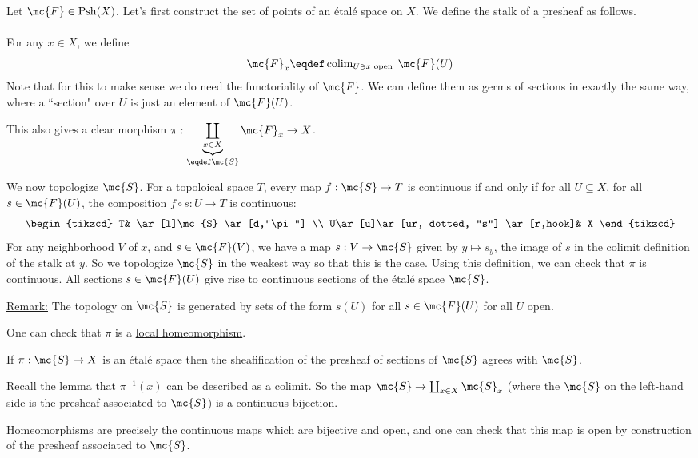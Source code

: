 \documentclass[x11names,reqno,14pt]{extarticle}
\DeclareMathOperator{\Psh}{Psh}
\begin{document}
Let $\mc{F} \in \Psh(X)$. Let's first construct the set of points of an \'etal\'e space on $X$. We define the stalk of a presheaf as follows. 

\paragraph{} For any $x \in X$, we define 
\[
\mc{F}_x\eqdef \operatorname{colim}_{U\ni x\text{ open }}\mc{F}(U)
\]
Note that for this to make sense we do need the functoriality of $\mc{F}$. We can define them as germs of sections in exactly the same way, where a ``section" over $U$ is just an element of $\mc{F}(U)$. 

This also gives a clear morphism $\pi:\underbrace{\coprod_{x\in X}}_{\eqdef \mc{S}}\mc{F}_x\to X$.

We now topologize $\mc{S}$. For a topoloical space $T$, every map $f:\mc{S}\to T$ is continuous if and only if for all $U \subseteq X$, for all $s \in \mc{F}(U)$, the composition $f\circ s:U\to T$ is continuous:
\[
\begin{tikzcd}
T& \ar[l]\mc{S} \ar[d,"\pi"] \\
U\ar[u]\ar[ur, dotted, "s"] \ar[r,hook]& X 
\end{tikzcd}
\]
For any neighborhood $V$ of $x$, and $s \in \mc{F}(V)$, we have a map $s:V\to \mc{S}$ given by $y\mapsto s_y$, the image of $s$ in the colimit definition of the stalk at $y$.
So we topologize $\mc{S}$ in the weakest way so that this is the case. Using this definition, we can check that $\pi$ is continuous. All sections $s \in \mc{F}(U)$ give rise to continuous sections of the \'etal\'e space $\mc{S}$. 

\underline{Remark:} The topology on $\mc{S}$ is generated by sets of the form $s(U)$ for all $s\in \mc{F}(U)$ for all $U$ open. 

One can check that $\pi$ is a \underline{local homeomorphism}. 

\claim

If $\pi:\mc{S}\to X$ is an \'etal\'e space then the sheafification of the presheaf of sections of $\mc{S}$ agrees with $\mc{S}$. 

\proof

Recall the lemma that $\pi^{-1}(x)$ can be described as a colimit. So the map $\mc{S} \to \coprod_{x\in X}\mc{S}_x$ (where the $\mc{S}$ on the left-hand side is the presheaf associated to $\mc{S}$) is a continuous bijection. 

Homeomorphisms are precisely the continuous maps which are bijective and open, and one can check that this map is open by construction of the presheaf associated to $\mc{S}$. 
\end{document}
